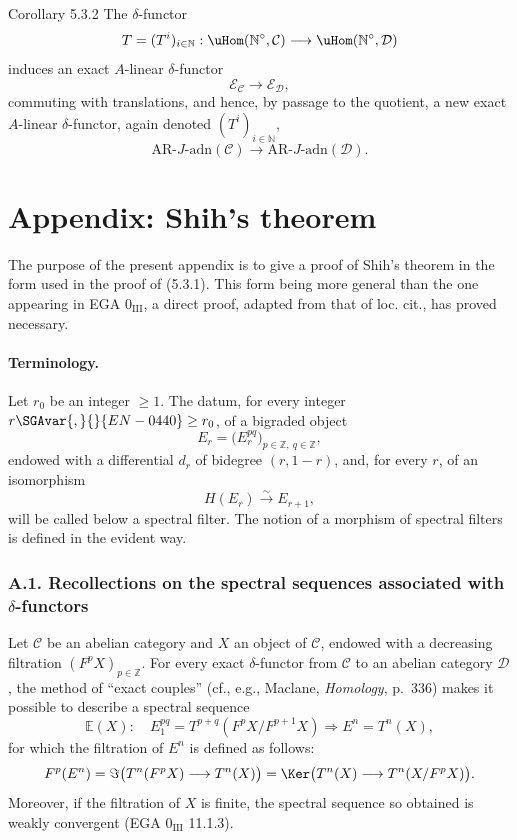 \begin{statement}{Corollary 5.3.2}
The \(\delta\)-functor
\[
T=(T^i)_{i\in\mathbb N}:\uHom(\mathbb N^\circ,\mathcal C)\longrightarrow\uHom(\mathbb N^\circ,\mathcal D)
\]
induces an exact \(A\)-linear \(\delta\)-functor
\[
\mathcal E_{\mathcal C}\longrightarrow\mathcal E_{\mathcal D},
\]
commuting with translations, and hence, by passage to the quotient, a new exact \(A\)-linear \(\delta\)-functor, again denoted \((T^i)_{i\in\mathbb N}\),
\[
\mathrm{AR}\text{-}J\text{-adn}(\mathcal C)\longrightarrow
\mathrm{AR}\text{-}J\text{-adn}(\mathcal D).
\]
\end{statement}

\section*{Appendix: Shih's theorem}

The purpose of the present appendix is to give a proof of Shih's theorem in the form used in the proof of (5.3.1). This form being more general than the one appearing in EGA \(0_{\mathrm{III}}\), a direct proof, adapted from that of loc. cit., has proved necessary.

\paragraph{Terminology.}
Let \(r_0\) be an integer \(\ge1\). The datum, for every integer \(r\SGAvar{,}{}{EN-0440}\ge r_0\), of a bigraded object
\[
E_r=\bigl(E_r^{pq}\bigr)_{p\in\mathbb Z,\ q\in\mathbb Z},
\]
endowed with a differential \(d_r\) of bidegree \((r,1-r)\), and, for every \(r\), of an isomorphism
\[
H(E_r)\xrightarrow{\sim}E_{r+1},
\]
will be called below a spectral filter. The notion of a morphism of spectral filters is defined in the evident way.

\subsubsection*{A.1. Recollections on the spectral sequences associated with \(\delta\)-functors}

Let \(\mathcal C\) be an abelian category and \(X\) an object of \(\mathcal C\), endowed with a decreasing filtration \((F^pX)_{p\in\mathbb Z}\). For every exact \(\delta\)-functor from \(\mathcal C\) to an abelian category \(\mathcal D\), the method of “exact couples” (cf., e.g., Maclane, \emph{Homology}, p.~336) makes it possible to describe a spectral sequence
\[
\mathbb{E}(X):\quad E_1^{pq}=T^{p+q}(F^pX/F^{p+1}X)\Rightarrow E^n=T^n(X),
\]
for which the filtration of \(E^n\) is defined as follows:
\[
F^p(E^n)=\Im\bigl(T^n(F^pX)\longrightarrow T^n(X)\bigr)
=\Ker\bigl(T^n(X)\longrightarrow T^n(X/F^pX)\bigr).
\]
Moreover, if the filtration of \(X\) is finite, the spectral sequence so obtained is weakly convergent (EGA \(0_{\mathrm{III}}\) 11.1.3).

